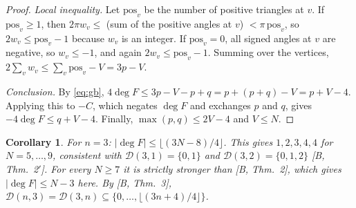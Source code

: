 \documentclass[11pt]{amsart}
\newtheorem{corollary}[theorem]{Corollary}
\theoremstyle{remark}
\begin{document}
\begin{proof}
\emph{Local inequality.}
Let $\mathrm{pos}_v$ be the number of positive triangles at $v$.
If $\mathrm{pos}_v\ge1$, then $2\pi w_v\le$ (sum of the positive angles at $v$) $<\pi\,\mathrm{pos}_v$, so $2w_v\le\mathrm{pos}_v-1$ because $w_v$ is an integer.
If $\mathrm{pos}_v=0$, all signed angles at $v$ are negative, so $w_v\le-1$, and again $2w_v\le\mathrm{pos}_v-1$.
Summing over the vertices, $2\sum_vw_v\le\sum_v\mathrm{pos}_v-V=3p-V$.

\emph{Conclusion.}
By \eqref{eq:gb}, $4\deg F\le 3p-V-p+q=p+(p+q)-V=p+V-4$.
Applying this to $-C$, which negates $\deg F$ and exchanges $p$ and $q$, gives $-4\deg F\le q+V-4$.
Finally, $\max(p,q)\le 2V-4$ and $V\le N$.
\end{proof}

\begin{corollary}
For $n=3$: $|\deg F|\le\lfloor(3N-8)/4\rfloor$.
This gives $1,2,3,4,4$ for $N=5,\dots,9$, consistent with $\mathcal D(3,1)=\{0,1\}$ and $\mathcal D(3,2)=\{0,1,2\}$ [B, Thm.~2$'$].
For every $N\ge7$ it is strictly stronger than [B, Thm.~2], which gives $|\deg F|\le N-3$ here.
By [B, Thm.~3], $\mathcal D(n,3)=\mathcal D(3,n)\subseteq\{0,\dots,\lfloor(3n+4)/4\rfloor\}$.
\end{corollary}
\end{document}
